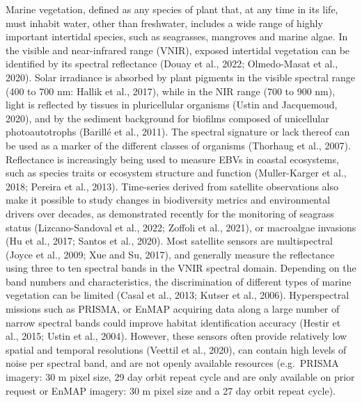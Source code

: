 \documentclass[
  letterpaper,
  11pt,
  english,
  singlespacing,
  headsepline]{MastersDoctoralThesis}
\begin{document}
\begin{spacing}{1.5}
Marine vegetation, defined as any species of plant that, at any time in
its life, must inhabit water, other than freshwater, includes a wide
range of highly important intertidal species, such as seagrasses,
mangroves and marine algae. In the visible and near-infrared range
(VNIR), exposed intertidal vegetation can be identified by its spectral
reflectance (Douay et al., 2022; Olmedo-Masat et al., 2020). Solar
irradiance is absorbed by plant pigments in the visible spectral range
(400 to 700 nm: Hallik et al., 2017), while in the NIR range (700 to 900
nm), light is reflected by tissues in pluricellular organisms (Ustin and
Jacquemoud, 2020), and by the sediment background for biofilms composed
of unicellular photoautotrophs (Barillé et al., 2011). The spectral
signature or lack thereof can be used as a marker of the different
classes of organisms (Thorhaug et al., 2007). Reflectance is
increasingly being used to measure EBVs in coastal ecosystems, such as
species traits or ecosystem structure and function (Muller-Karger et
al., 2018; Pereira et al., 2013). Time-series derived from satellite
observations also make it possible to study changes in biodiversity
metrics and environmental drivers over decades, as demonstrated recently
for the monitoring of seagrass status (Lizcano-Sandoval et al., 2022;
Zoffoli et al., 2021), or macroalgae invasions (Hu et al., 2017; Santos
et al., 2020). Most satellite sensors are multispectral (Joyce et al.,
2009; Xue and Su, 2017), and generally measure the reflectance using
three to ten spectral bands in the VNIR spectral domain. Depending on
the band numbers and characteristics, the discrimination of different
types of marine vegetation can be limited (Casal et al., 2013; Kutser et
al., 2006). Hyperspectral missions such as PRISMA, or EnMAP acquiring
data along a large number of narrow spectral bands could improve habitat
identification accuracy (Hestir et al., 2015; Ustin et al., 2004).
However, these sensors often provide relatively low spatial and temporal
resolutions (Veettil et al., 2020), can contain high levels of noise per
spectral band, and are not openly available resources (e.g.~PRISMA
imagery: 30 m pixel size, 29 day orbit repeat cycle and are only
available on prior request or EnMAP imagery: 30 m pixel size and a 27
day orbit repeat cycle).


\end{spacing}
\end{document}
